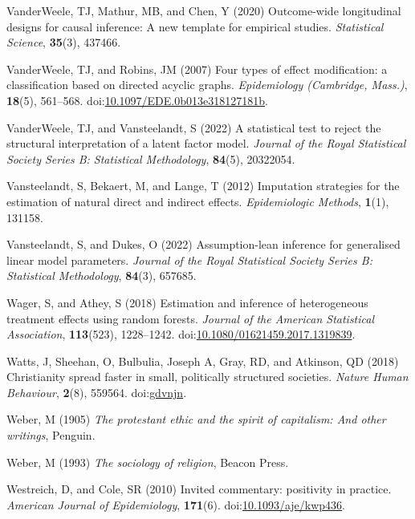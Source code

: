 \documentclass[
  singlecolumn,
  9pt]{article}
\begin{document}
\begin{CSLReferences}
VanderWeele, TJ, Mathur, MB, and Chen, Y (2020) Outcome-wide
longitudinal designs for causal inference: A new template for empirical
studies. \emph{Statistical Science}, \textbf{35}(3), 437466.

VanderWeele, TJ, and Robins, JM (2007) Four types of effect
modification: a classification based on directed acyclic graphs.
\emph{Epidemiology (Cambridge, Mass.)}, \textbf{18}(5), 561--568.
doi:\href{https://doi.org/10.1097/EDE.0b013e318127181b}{10.1097/EDE.0b013e318127181b}.

VanderWeele, TJ, and Vansteelandt, S (2022) A statistical test to reject
the structural interpretation of a latent factor model. \emph{Journal of
the Royal Statistical Society Series B: Statistical Methodology},
\textbf{84}(5), 20322054.

Vansteelandt, S, Bekaert, M, and Lange, T (2012) Imputation strategies
for the estimation of natural direct and indirect effects.
\emph{Epidemiologic Methods}, \textbf{1}(1), 131158.

Vansteelandt, S, and Dukes, O (2022) Assumption-lean inference for
generalised linear model parameters. \emph{Journal of the Royal
Statistical Society Series B: Statistical Methodology}, \textbf{84}(3),
657685.

Wager, S, and Athey, S (2018) Estimation and inference of heterogeneous
treatment effects using random forests. \emph{Journal of the American
Statistical Association}, \textbf{113}(523), 1228--1242.
doi:\href{https://doi.org/10.1080/01621459.2017.1319839}{10.1080/01621459.2017.1319839}.

Watts, J, Sheehan, O, Bulbulia, Joseph A, Gray, RD, and Atkinson, QD
(2018) Christianity spread faster in small, politically structured
societies. \emph{Nature Human Behaviour}, \textbf{2}(8), 559564.
doi:\href{https://doi.org/gdvnjn}{gdvnjn}.

Weber, M (1905) \emph{The protestant ethic and the spirit of capitalism:
And other writings}, Penguin.

Weber, M (1993) \emph{The sociology of religion}, Beacon Press.

Westreich, D, and Cole, SR (2010) Invited commentary: positivity in
practice. \emph{American Journal of Epidemiology}, \textbf{171}(6).
doi:\href{https://doi.org/10.1093/aje/kwp436}{10.1093/aje/kwp436}.


\end{CSLReferences}
\end{document}
